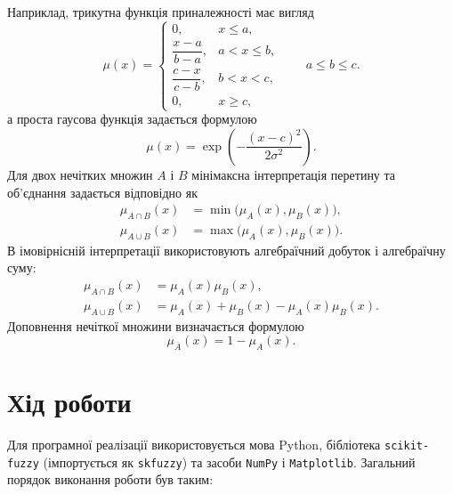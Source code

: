\documentclass[12pt,a4paper]{article}
\begin{document}
Наприклад, трикутна функція приналежності має вигляд
\begin{equation}
  \mu(x)=
  \begin{cases}
    0, & x\le a,\\
    \dfrac{x-a}{b-a}, & a<x\le b,\\
    \dfrac{c-x}{c-b}, & b<x<c,\\
    0, & x\ge c,
  \end{cases}
  \qquad a\le b\le c.
  \label{eq:trimf}
\end{equation}
а проста гаусова функція задається формулою
\begin{equation}
  \mu(x)=\exp\!\left(-\frac{(x-c)^2}{2\sigma^2}\right).
  \label{eq:gaussmf}
\end{equation}
Для двох нечітких множин $A$ і $B$ мінімаксна інтерпретація перетину та
об'єднання задається відповідно як
\begin{equation}
  \begin{aligned}
    \mu_{A\cap B}(x)&=\min\!\bigl(\mu_A(x),\mu_B(x)\bigr),\\
    \mu_{A\cup B}(x)&=\max\!\bigl(\mu_A(x),\mu_B(x)\bigr).
  \end{aligned}
  \label{eq:minmax}
\end{equation}
В імовірнісній інтерпретації використовують алгебраїчний добуток і
алгебраїчну суму:
\begin{equation}
  \begin{aligned}
    \mu_{A\cap B}(x)&=\mu_A(x)\mu_B(x),\\
    \mu_{A\cup B}(x)&=\mu_A(x)+\mu_B(x)-\mu_A(x)\mu_B(x).
  \end{aligned}
  \label{eq:probabilistic}
\end{equation}
Доповнення нечіткої множини визначається формулою
\begin{equation}
  \mu_{\overline A}(x)=1-\mu_A(x).
  \label{eq:complement}
\end{equation}

\section{Хід роботи}

Для програмної реалізації використовується мова Python, бібліотека
\texttt{scikit-fuzzy} (імпортується як \texttt{skfuzzy}) та засоби
\texttt{NumPy} і \texttt{Matplotlib}. Загальний порядок виконання роботи був
таким:
\end{document}
